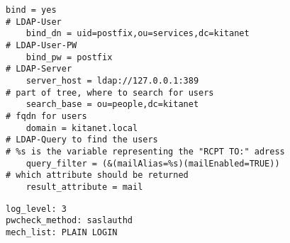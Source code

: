 \begin{lstlisting}[caption={/etc/postfix/ldap\_virtual\_aliases.cf}, label={postfix/aliases.cf}]
	bind = yes
# LDAP-User
	bind_dn = uid=postfix,ou=services,dc=kitanet
# LDAP-User-PW
	bind_pw = postfix
# LDAP-Server
	server_host = ldap://127.0.0.1:389
# part of tree, where to search for users
	search_base = ou=people,dc=kitanet
# fqdn for users
	domain = kitanet.local
# LDAP-Query to find the users
# %s is the variable representing the "RCPT TO:" adress
	query_filter = (&(mailAlias=%s)(mailEnabled=TRUE))
# which attribute should be returned
	result_attribute = mail
\end{lstlisting}
\begin{lstlisting}[caption={/etc/postfix/sasl/smtpd.conf}, label={postfix/sasl}]
log_level: 3
pwcheck_method: saslauthd
mech_list: PLAIN LOGIN
\end{lstlisting}